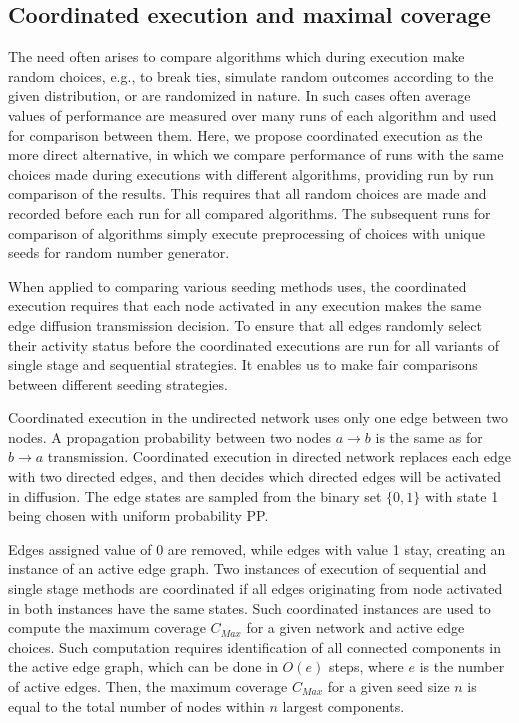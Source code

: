\documentclass[11pt]{article} %
\begin{document}
\subsection*{Coordinated execution and maximal coverage}
The need often arises to compare algorithms which during execution make random choices, e.g., to break ties, simulate random outcomes according to the given distribution, or are randomized in nature. In such cases often average values of performance are measured over many runs of each algorithm and used for comparison between them. Here, we propose coordinated execution as the more direct alternative, in which we compare performance of runs with the same choices made during executions with different algorithms, providing run by run comparison of the results. This requires that all random choices are made and recorded before each run for all compared algorithms. The subsequent runs for comparison of algorithms simply execute preprocessing of choices with unique seeds for random number generator.

When applied to comparing various seeding methods uses, the coordinated execution requires that each node activated in any execution makes the same edge diffusion transmission decision. To ensure that all edges randomly select their activity status before the coordinated executions are run for all variants of single stage and sequential strategies. It enables us to make fair comparisons between different seeding strategies.

Coordinated execution in the undirected network uses only one edge between two nodes. A propagation probability between two nodes $a \rightarrow b$ is the same as for $b \rightarrow a$ transmission. Coordinated execution in directed network replaces each edge with two directed edges, and then decides which directed edges will be activated in diffusion. The edge states are sampled from the binary set $\{0,1\}$ with state 1 being chosen with uniform probability PP. 

Edges assigned value of 0 are removed, while edges with value 1 stay, creating an instance of an active edge graph. Two instances of execution of sequential and single stage methods are coordinated if all edges originating from node activated in both instances have the same states. Such coordinated instances are used to compute the maximum coverage $C_{Max}$ for a given network and active edge choices. Such computation requires identification of all connected components in the active edge graph, which can be done in $O(e)$ steps, where $e$ is the number of active edges. Then, the maximum coverage $C_{Max}$ for a given seed size $n$ is equal to the total number of nodes within $n$ largest components.
\end{document}
